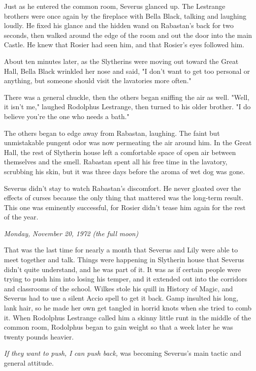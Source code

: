 \documentclass[a4paper,11pt]{article}
\begin{document}
Just as he entered the common room, Severus glanced up. The Lestrange brothers were once again by the fireplace with Bella Black, talking and laughing loudly. He fixed his glance and the hidden wand on Rabastan's back for two seconds, then walked around the edge of the room and out the door into the main Castle. He knew that Rosier had seen him, and that Rosier's eyes followed him.

About ten minutes later, as the Slytherins were moving out toward the Great Hall, Bella Black wrinkled her nose and said, "I don't want to get too personal or anything, but someone should visit the lavatories more often."

There was a general chuckle, then the others began sniffing the air as well. "Well, it isn't me," laughed Rodolphus Lestrange, then turned to his older brother. "I do believe you're the one who needs a bath."

The others began to edge away from Rabastan, laughing. The faint but unmistakable pungent odor was now permeating the air around him. In the Great Hall, the rest of Slytherin house left a comfortable space of open air between themselves and the smell. Rabastan spent all his free time in the lavatory, scrubbing his skin, but it was three days before the aroma of wet dog was gone.

Severus didn't stay to watch Rabastan's discomfort. He never gloated over the effects of curses because the only thing that mattered was the long-term result. This one was eminently successful, for Rosier didn't tease him again for the rest of the year.

\emph{Monday, November 20, 1972 (the full moon)}

That was the last time for nearly a month that Severus and Lily were able to meet together and talk. Things were happening in Slytherin house that Severus didn't quite understand, and he was part of it. It was as if certain people were trying to push him into losing his temper, and it extended out into the corridors and classrooms of the school. Wilkes stole his quill in History of Magic, and Severus had to use a silent Accio spell to get it back. Gamp insulted his long, lank hair, so he made her own get tangled in horrid knots when she tried to comb it. When Rodolphus Lestrange called him a skinny little runt in the middle of the common room, Rodolphus began to gain weight so that a week later he was twenty pounds heavier.

\emph{If they want to push, I can push back,} was becoming Severus's main tactic and general attitude.
\end{document}
